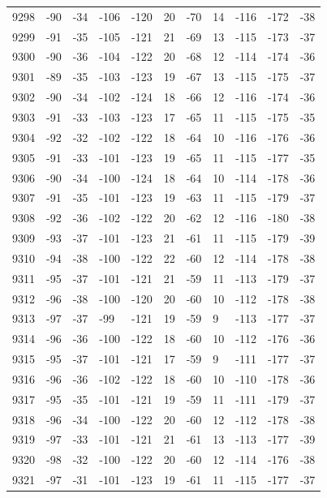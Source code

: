 \begin{table}[H]
\begin{tabular}{lllllllllll}
9298 & -90 & -34 & -106 & -120 & 20 & -70 & 14 & -116 & -172 & -38 \\
9299 & -91 & -35 & -105 & -121 & 21 & -69 & 13 & -115 & -173 & -37 \\
9300 & -90 & -36 & -104 & -122 & 20 & -68 & 12 & -114 & -174 & -36 \\
9301 & -89 & -35 & -103 & -123 & 19 & -67 & 13 & -115 & -175 & -37 \\
9302 & -90 & -34 & -102 & -124 & 18 & -66 & 12 & -116 & -174 & -36 \\
9303 & -91 & -33 & -103 & -123 & 17 & -65 & 11 & -115 & -175 & -35 \\
9304 & -92 & -32 & -102 & -122 & 18 & -64 & 10 & -116 & -176 & -36 \\
9305 & -91 & -33 & -101 & -123 & 19 & -65 & 11 & -115 & -177 & -35 \\
9306 & -90 & -34 & -100 & -124 & 18 & -64 & 10 & -114 & -178 & -36 \\
9307 & -91 & -35 & -101 & -123 & 19 & -63 & 11 & -115 & -179 & -37 \\
9308 & -92 & -36 & -102 & -122 & 20 & -62 & 12 & -116 & -180 & -38 \\
9309 & -93 & -37 & -101 & -123 & 21 & -61 & 11 & -115 & -179 & -39 \\
9310 & -94 & -38 & -100 & -122 & 22 & -60 & 12 & -114 & -178 & -38 \\
9311 & -95 & -37 & -101 & -121 & 21 & -59 & 11 & -113 & -179 & -37 \\
9312 & -96 & -38 & -100 & -120 & 20 & -60 & 10 & -112 & -178 & -38 \\
9313 & -97 & -37 & -99 & -121 & 19 & -59 & 9 & -113 & -177 & -37 \\
9314 & -96 & -36 & -100 & -122 & 18 & -60 & 10 & -112 & -176 & -36 \\
9315 & -95 & -37 & -101 & -121 & 17 & -59 & 9 & -111 & -177 & -37 \\
9316 & -96 & -36 & -102 & -122 & 18 & -60 & 10 & -110 & -178 & -36 \\
9317 & -95 & -35 & -101 & -121 & 19 & -59 & 11 & -111 & -179 & -37 \\
9318 & -96 & -34 & -100 & -122 & 20 & -60 & 12 & -112 & -178 & -38 \\
9319 & -97 & -33 & -101 & -121 & 21 & -61 & 13 & -113 & -177 & -39 \\
9320 & -98 & -32 & -100 & -122 & 20 & -60 & 12 & -114 & -176 & -38 \\
9321 & -97 & -31 & -101 & -123 & 19 & -61 & 11 & -115 & -177 & -37 \\

\end{tabular}
\end{table}
